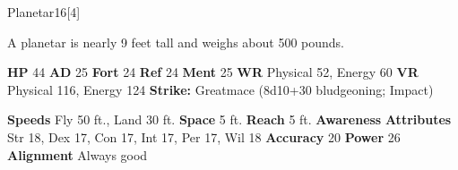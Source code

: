   \begin{monsubsection}{Planetar}{16}[4]
    \vspace{-1em}\vspace{-1em}
    \vspace{0em}

    
          A planetar is nearly 9 feet tall and weighs about 500 pounds.
        

    \begin{spellcontent}
      \begin{spelltargetinginfo}
        \pari \textbf{HP} 44 \monsep
          \textbf{AD} 25 \monsep
          \textbf{Fort} 24 \monsep
          \textbf{Ref} 24 \monsep
          \textbf{Ment} 25
        \pari \textbf{WR} Physical 52, Energy 60 \monsep
        \textbf{VR} Physical 116, Energy 124
        \pari \textbf{Strike:}
            Greatmace  (8d10+30 bludgeoning; Impact)
      \end{spelltargetinginfo}
    \end{spellcontent}
    \begin{monsterfooter}
      \pari \textbf{Speeds} Fly 50 ft., Land 30 ft. \monsep
        \textbf{Space} 5 ft. \monsep
        \textbf{Reach} 5 ft.
      \pari \textbf{Awareness} 
      \pari \textbf{Attributes}
        Str 18, Dex 17,
        Con 17, Int 17,
        Per 17, Wil 18
      \pari \textbf{Accuracy} 20 \monsep
        \textbf{Power} 26
      \pari \textbf{Alignment} Always good
    \end{monsterfooter}
  \end{monsubsection}
  
  

